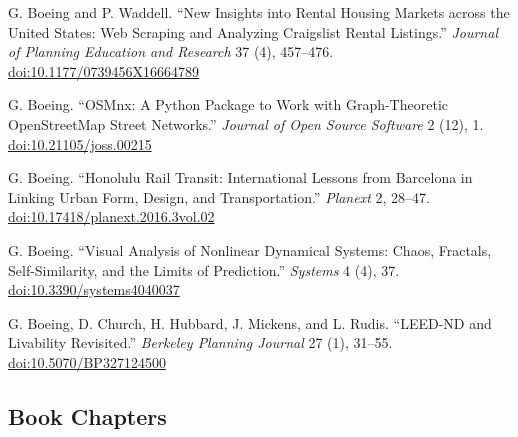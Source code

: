 \begin{tablist}
        \item[2017] \tab{}G. Boeing and P. Waddell. \enquote{New Insights into Rental Housing Markets across the United States: Web Scraping and Analyzing Craigslist Rental Listings.} \textit{Journal of Planning Education and Research} 37 (4), 457--476. \href{https://doi.org/10.1177/0739456X16664789}{doi:10.1177/0739456X16664789}

        \item[2017] \tab{}G. Boeing. \enquote{OSMnx: A Python Package to Work with Graph-Theoretic OpenStreetMap Street Networks.} \textit{Journal of Open Source Software} 2 (12), 1. \href{https://doi.org/10.21105/joss.00215}{doi:10.21105/joss.00215}

        \item[2016] \tab{}G. Boeing. \enquote{Honolulu Rail Transit: International Lessons from Barcelona in Linking Urban Form, Design, and Transportation.} \textit{Planext} 2, 28--47. \href{https://doi.org/10.17418/planext.2016.3vol.02}{doi:10.17418/planext.2016.3vol.02}

        \item[2016] \tab{}G. Boeing. \enquote{Visual Analysis of Nonlinear Dynamical Systems: Chaos, Fractals, Self-Similarity, and the Limits of Prediction.} \textit{Systems} 4 (4), 37. \href{https://doi.org/10.3390/systems4040037}{doi:10.3390/systems4040037}

        \item[2014] \tab{}G. Boeing, D. Church, H. Hubbard, J. Mickens, and L. Rudis. \enquote{LEED-ND and Livability Revisited.} \textit{Berkeley Planning Journal} 27 (1), 31--55. \href{https://doi.org/10.5070/BP327124500}{doi:10.5070/BP327124500}

    \end{tablist}



    \subsection*{Book Chapters}

